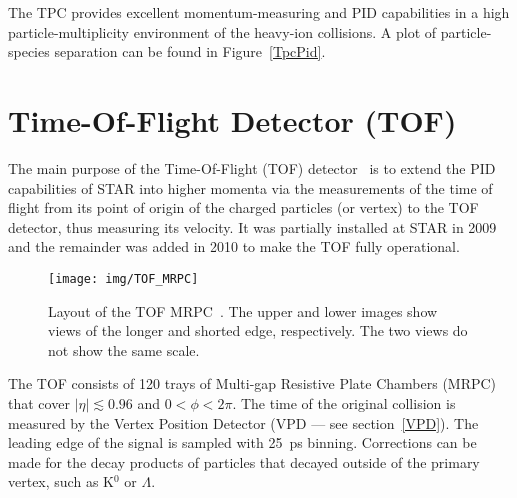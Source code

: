 The TPC provides excellent momentum-measuring and PID capabilities in a high particle-multiplicity environment of the heavy-ion collisions.
A plot of particle-species separation can be found in Figure~\ref{TpcPid}.
\section{Time-Of-Flight Detector (TOF)\label{TOFsection}} 



The main purpose of the Time-Of-Flight (TOF) detector~\cite{TOFproposal} is to extend the PID capabilities of STAR into higher 
momenta via the measurements of the time of flight from its point of origin of the charged particles (or vertex) to the TOF 
detector, thus measuring its velocity. It was partially installed at STAR in 2009 and the remainder was added in 2010 
to make the TOF fully operational.

\begin{figure}[!htb]
\begin{center}
 \texttt{[image: img/TOF\_MRPC]}\\
\end{center}
\caption[Layout of the TOF MRPC\@.]{\label{TOF_mrpc}Layout of the TOF MRPC~\cite{TOFproposal}\@. The upper and lower images show views of the longer and shorted edge, respectively. The two views do not show the same scale.}
\end{figure}

The TOF consists of 120 trays of Multi-gap Resistive Plate Chambers (MRPC)~\cite{MRPC} that cover $|\eta| \lesssim 0.96$ and $0 < \phi < 2\pi$. The time of the original collision is measured 
by the Vertex Position Detector (VPD --- see section~\ref{VPD}). The leading edge of 
the signal is sampled with \SI{25}{\pico\second} binning. Corrections can be made for the decay products of particles that 
decayed outside of the primary vertex, such as K$^0$ or $\Lambda$\@. 



